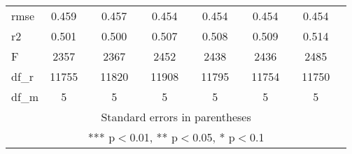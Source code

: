 \documentclass[]{article}
\begin{document}
\begin{tabular}{lcccccccccccc}
rmse & 0.459 &  & 0.457 &  & 0.454 &  & 0.454 &  & 0.454 &  & 0.454 &  \\
r2 & 0.501 &  & 0.500 &  & 0.507 &  & 0.508 &  & 0.509 &  & 0.514 &  \\
F & 2357 &  & 2367 &  & 2452 &  & 2438 &  & 2436 &  & 2485 &  \\
df\_r & 11755 &  & 11820 &  & 11908 &  & 11795 &  & 11754 &  & 11750 &  \\
 df\_m & 5 &  & 5 &  & 5 &  & 5 &  & 5 &  & 5 &  \\ \hline
\multicolumn{13}{c}{ Standard errors in parentheses} \\
\multicolumn{13}{c}{ *** p$<$0.01, ** p$<$0.05, * p$<$0.1} \\
\end{tabular}
\end{document}
